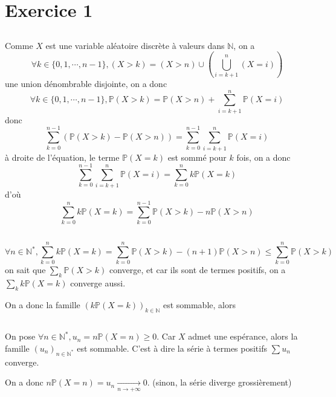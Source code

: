 \documentclass[a4paper,12pt]{book}
\begin{document}
\renewcommand{\labelitemi}{$\blacktriangleright$}
\renewcommand{\labelitemii}{$\bullet$}



\section{Exercice 1}
\subsection{}
Comme $X$ est une variable aléatoire discrète à valeurs dans $\mathbb{N}$, on a 
$$\forall k \in \{0,1,\cdots,n-1\}, (X>k)=(X>n) \cup \left(\bigcup_{i=k+1}^n (X=i)\right)$$
une union dénombrable disjointe, on a donc 
$$
\forall k \in \{0,1,\cdots,n-1\}, \mathbb{P}(X>k)=\mathbb{P}(X>n)+\sum_{i=k+1}^n \mathbb{P}(X=i)
$$
donc 
$$
\sum_{k=0}^{n-1}\left(\mathbb{P}(X>k)-\mathbb{P}(X>n)\right)=\sum_{k=0}^{n-1}\sum_{i=k+1}^n \mathbb{P}(X=i)
$$
à droite de l'équation, le terme $\mathbb{P}(X=k)$ est sommé pour $k$ fois, on a donc 
$$
\sum_{k=0}^{n-1}\sum_{i=k+1}^n \mathbb{P}(X=i)=\sum_{k=0}^n k\mathbb{P}(X=k)
$$
d'où 
$$
\boxed{\sum_{k=0}^n k\mathbb{P}(X=k)=\sum_{k=0}^{n-1}\mathbb{P}(X>k)-n\mathbb{P}(X>n)}
$$

\subsection{}
$$\forall n \in \mathbb{N}^{*}, \sum_{k=0}^n k\mathbb{P}(X=k)=\sum_{k=0}^{n}\mathbb{P}(X>k)-(n+1)\mathbb{P}(X>n) \leq \sum_{k=0}^{n}\mathbb{P}(X>k)$$
on sait que $\sum_k \mathbb{P}(X>k)$ converge, et car ils sont de termes positifs, on a $\sum_k k\mathbb{P}(X=k)$ converge aussi. 

On a donc la famille $\left(k\mathbb{P}(X=k)\right)_{k \in \mathbb{N}}$ est sommable, alors 

\subsection{}
On pose $\forall n \in \mathbb{N}^{*}, u_n=n\mathbb{P}(X=n) \geq 0$. Car $X$ admet une espérance, alors la famille $(u_n)_{n \in \mathbb{N}^{*}}$ est sommable. 
C'est à dire la série à termes positifs $\sum u_n$ converge. 

On a donc $\boxed{n\mathbb{P}(X=n)=u_n\xrightarrow[n \to +\infty]{} 0}$. (sinon, la série diverge grossièrement)
\end{document}
